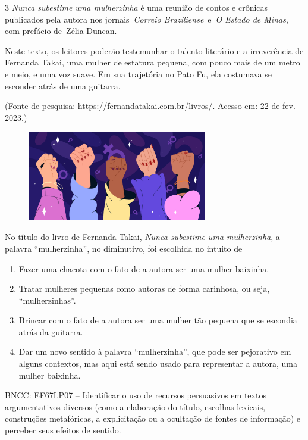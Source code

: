 \num{3} \emph{Nunca subestime uma mulherzinha} é uma reunião de contos e
crônicas publicados pela autora nos jornais~\emph{Correio
Braziliense}~e~\emph{O Estado de Minas}, com prefácio de~Zélia Duncan.

Neste texto, os leitores poderão testemunhar o talento literário e a
irreverência de Fernanda Takai, uma mulher de estatura pequena, com
pouco mais de um metro e meio, e uma voz suave. Em sua trajetória no
Pato Fu, ela costumava se esconder atrás de uma guitarra.

(Fonte de pesquisa:
\url{https://fernandatakai.com.br/livros/}.
Acesso em: 22 de fev. 2023.)

\begin{figure}
\includegraphics[width=0.7\textwidth]{./imgSAEB_6_POR/freepik/PORT_6_IMG-7.jpeg}
\end{figure}

No título do livro de Fernanda Takai, \emph{Nunca subestime uma
mulherzinha}, a palavra ``mulherzinha'', no diminutivo, foi escolhida no
intuito de

\begin{enumerate}
\def\labelenumi{\alph{enumi})}
\item Fazer uma chacota com o fato de a autora ser uma mulher baixinha.
\item Tratar mulheres pequenas como autoras de forma carinhosa, ou seja,
``mulherzinhas''.
\item Brincar com o fato de a autora ser uma mulher tão pequena que se
escondia atrás da guitarra.
\item Dar um novo sentido à palavra ``mulherzinha'', que pode ser
pejorativo em alguns contextos, mas aqui está sendo usado para
representar a autora, uma mulher baixinha.
\end{enumerate}

BNCC: EF67LP07 -- Identificar o uso de recursos persuasivos em textos
argumentativos diversos (como a elaboração do título, escolhas lexicais,
construções metafóricas, a explicitação ou a ocultação de fontes de
informação) e perceber seus efeitos de sentido.

